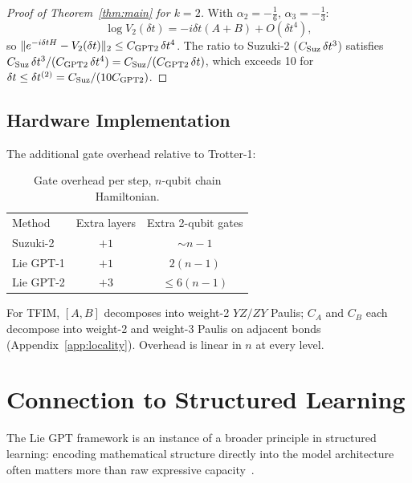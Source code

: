 \documentclass[aps,prxquantum,twocolumn,nofootinbib]{revtex4-2}
\begin{document}
\begin{proof}[Proof of Theorem~\ref{thm:main} for $k=2$]
With $\alpha_2=-\frac{1}{6}$, $\alpha_3=-\frac{1}{3}$:
\begin{equation*}
  \log V_2(\delta t)
  = -i\delta t(A+B) + O(\delta t^4),
\end{equation*}
so $\|e^{-i\delta t H} - V_2(\delta t)\|_2 \leq C_{\rm GPT2}\,\delta t^4$.
The ratio to Suzuki-2 ($C_{\rm Suz}\,\delta t^3$) satisfies
$C_{\rm Suz}\,\delta t^3 / (C_{\rm GPT2}\,\delta t^4) = C_{\rm Suz}/(C_{\rm GPT2}\,\delta t)$,
which exceeds 10 for $\delta t \leq \delta t^{(2)} = C_{\rm Suz}/(10 C_{\rm GPT2})$.
\end{proof}

\subsection{Hardware Implementation}

The additional gate overhead relative to Trotter-1:
\begin{table}[t]
  \caption{Gate overhead per step, $n$-qubit chain Hamiltonian.}
  \label{tab:gate-overhead}
  \begin{ruledtabular}
    \small
    \begin{tabular}{lcc}
      Method & Extra layers & Extra 2-qubit gates \\
      \colrule
      Suzuki-2       & $+1$ & $\sim n-1$ \\
      Lie GPT-1      & $+1$ & $2(n-1)$ \\
      Lie GPT-2      & $+3$ & $\leq 6(n-1)$ \\
    \end{tabular}
  \end{ruledtabular}
\end{table}

For TFIM, $[A,B]$ decomposes into weight-2 $YZ/ZY$ Paulis; $C_A$ and
$C_B$ each decompose into weight-2 and weight-3 Paulis on adjacent
bonds (Appendix~\ref{app:locality}). Overhead is linear in $n$ at
every level.

\section{Connection to Structured Learning}
\label{sec:litreview}

The Lie GPT framework is an instance of a broader principle in
structured learning: encoding mathematical structure directly into the
model architecture often matters more than raw expressive
capacity~\cite{nips_alkinfsghb24,icml_ragone2024,nips_yangrdwy24}.
\end{document}
